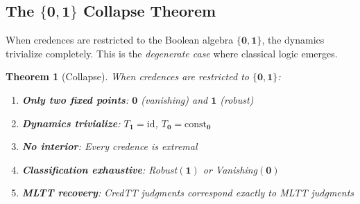 \documentclass[11pt,a4paper]{article}
\newtheorem{theorem}{Theorem}[section]
\newcommand{\one}{\mathbf{1}}
\newcommand{\zero}{\mathbf{0}}
\begin{document}
\subsection{The $\{\zero,\one\}$ Collapse Theorem}

When credences are restricted to the Boolean algebra $\{\zero,\one\}$, the dynamics trivialize completely. This is the \emph{degenerate case} where classical logic emerges.

\begin{theorem}[Collapse]
When credences are restricted to $\{\zero,\one\}$:
\begin{enumerate}
    \item \textbf{Only two fixed points}: $\zero$ (vanishing) and $\one$ (robust)
    \item \textbf{Dynamics trivialize}: $T_\one = \mathrm{id}$, $T_\zero = \mathrm{const}_\zero$
    \item \textbf{No interior}: Every credence is extremal
    \item \textbf{Classification exhaustive}: Robust$(\one)$ or Vanishing$(\zero)$
    \item \textbf{MLTT recovery}: CredTT judgments correspond exactly to MLTT judgments
\end{enumerate}
\end{theorem}
\end{document}
